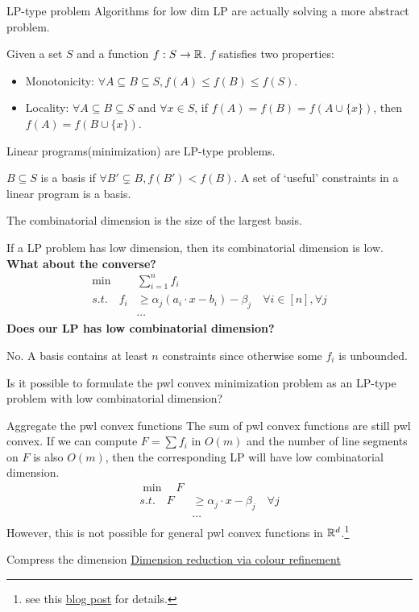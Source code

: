 \documentclass{beamer}
\begin{document}
\begin{frame}[allowframebreaks]{LP-type problem}
    Algorithms for low dim LP are actually solving a more abstract problem.
    \begin{definition}
        Given a set $S$ and a function $f:S\to \R$. $f$ satisfies two properties:%
        \begin{itemize}
            \item Monotonicity: $\forall A\subseteq B\subseteq S, f(A)\leq f(B)\leq f(S)$.
            \item Locality: $\forall A\subseteq B\subseteq S$ and $\forall x\in S$, if $f(A) = f(B) = f(A \cup \{x\})$, then $f(A) = f(B \cup \{x\})$.
        \end{itemize}
    \end{definition}
    Linear programs(minimization) are LP-type problems.

    $B\subseteq S$ is a basis if $\forall B'\subsetneq B, f(B')<f(B)$. A set of `useful' constraints in a linear program is a basis.

    The combinatorial dimension is the size of the largest basis.

    If a LP problem has low dimension, then its combinatorial dimension is low. \textbf{What about the converse?}
    \newpage
    \begin{align*}
        \min &\sum_{i=1}^n f_i\\
        s.t. \quad f_i&\geq \alpha_j(a_i\cdot x -b_i)-\beta_j \quad \forall i\in[n], \forall j\\
        &\cdots
    \end{align*}%
    \textbf{Does our LP has low combinatorial dimension?}
    
    No. A basis contains at least $n$ constraints since otherwise some $f_i$ is unbounded.

    \begin{problem}
        Is it possible to formulate the pwl convex minimization problem as an LP-type problem with low combinatorial dimension?
    \end{problem}
\end{frame}



\begin{frame}{Aggregate the pwl convex functions}
    The sum of pwl convex functions are still pwl convex. 
    \newline If we can compute $F=\sum f_i$ in $O(m)$ and the number of line segments on $F$ is also $O(m)$, then the corresponding LP will have low combinatorial dimension.
    \begin{align*}
        \min \quad F\\
        s.t. \quad F&\geq \alpha_j\cdot x -\beta_j \quad \forall j\\
        &\cdots
    \end{align*}
    However, this is not possible for general pwl convex functions in $\R^d$.\footnote{see this \href{https://talldoor.uk/posts/2024-09-16-piecewise-linear.html}{blog post} for details.}
\end{frame}

\begin{frame}{Compress the dimension}
    \href{https://arxiv.org/pdf/1307.5697}{Dimension reduction via colour refinement}
\end{frame}
\end{document}
